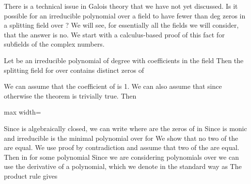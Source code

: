 \documentclass[11pt,oneside]{article}
\begin{document}
\fi
\renewcommand{\BookFooter}{Section 45 Separable Extensions}
\ifdefined\BookMaster\else\setcounter{page}{357}\fi
\BookNarrativetrue

\begin{BookBody}



\noindent There is a technical issue in Galois theory that we have not yet discussed. Is it possible for an irreducible polynomial  over a field  to have fewer than deg zeros in a splitting field over ? We will see, for essentially all the fields we will consider, that the answer is no. We start with a calculus-based proof of this fact for subfields of the complex numbers.

 Let  be an irreducible polynomial of degree  with coefficients in the field  Then the splitting field for  over  contains  distinct zeros of 

 We can assume that the coefficient of  is 1. We can also assume that  since otherwise the theorem is trivially true. Then

\begin{center}\begin{adjustbox}{max width=\linewidth}\end{adjustbox}\end{center}

\noindent Since  is algebraically closed, we can write  where  are the zeros of  in  Since  is monic and irreducible is the minimal polynomial over  for  We show that no two of the  are equal. We use proof by contradiction and assume that two of the  are equal. Then in   for some polynomial  Since we are considering polynomials over  we can use the derivative of a polynomial, which we denote in the standard way as  The product rule gives


\end{BookBody}
\end{document}
